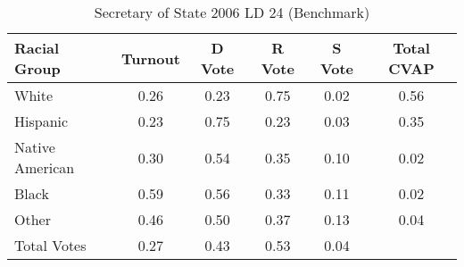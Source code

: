 \begin{table}[htb]
\begin{center}
\caption{Secretary of State 2006 LD 24 (Benchmark)}
\label{sos06_cvap_ld_24_benchmark}
\begin{tabular}{lccccc}
  \hline
Racial Group & Turnout & D Vote & R Vote & S Vote & Total CVAP \\ 
  \hline
White & 0.26 & 0.23 & 0.75 & 0.02 & 0.56 \\ 
  Hispanic & 0.23 & 0.75 & 0.23 & 0.03 & 0.35 \\ 
  Native American & 0.30 & 0.54 & 0.35 & 0.10 & 0.02 \\ 
  Black & 0.59 & 0.56 & 0.33 & 0.11 & 0.02 \\ 
  Other & 0.46 & 0.50 & 0.37 & 0.13 & 0.04 \\ 
  Total Votes & 0.27 & 0.43 & 0.53 & 0.04 &  \\ 
   \hline
\end{tabular}
\end{center}
\end{table}
